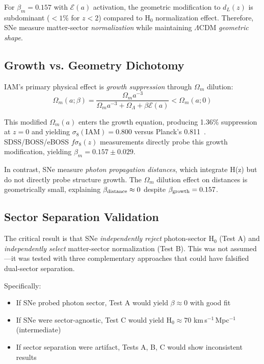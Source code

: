\documentclass[twocolumn,superscriptaddress,prd,amsmath,amssymb]{revtex4-2}
\begin{document}
For $\beta_m = 0.157$ with $\mathcal{E}(a)$ activation, the geometric modification to $d_L(z)$ is subdominant ($<1\%$ for $z < 2$) compared to H$_0$ normalization effect. Therefore, SNe measure matter-sector \textit{normalization} while maintaining $\Lambda$CDM \textit{geometric shape}.

\subsection{Growth vs. Geometry Dichotomy}

IAM's primary physical effect is \textit{growth suppression} through $\Omega_m$ dilution:
\begin{equation}
\Omega_m(a;\beta) = \frac{\Omega_m a^{-3}}{\Omega_m a^{-3} + \Omega_\Lambda + \beta\mathcal{E}(a)} < \Omega_m(a;0)
\end{equation}

This modified $\Omega_m(a)$ enters the growth equation, producing 1.36\% suppression at $z=0$ and yielding $\sigma_8(\text{IAM}) = 0.800$ versus Planck's 0.811~\cite{IAMCompendium2025}. SDSS/BOSS/eBOSS $f\sigma_8(z)$ measurements directly probe this growth modification, yielding $\beta_m = 0.157 \pm 0.029$.

In contrast, SNe measure \textit{photon propagation distances}, which integrate H(z) but do not directly probe structure growth. The $\Omega_m$ dilution effect on distances is geometrically small, explaining $\beta_{\rm distance} \approx 0$ despite $\beta_{\rm growth} = 0.157$.

\subsection{Sector Separation Validation}

The critical result is that SNe \textit{independently reject} photon-sector H$_0$ (Test A) and \textit{independently select} matter-sector normalization (Test B). This was not assumed—it was tested with three complementary approaches that could have falsified dual-sector separation.

Specifically:
\begin{itemize}
\item If SNe probed photon sector, Test A would yield $\beta \approx 0$ with good fit
\item If SNe were sector-agnostic, Test C would yield H$_0 \approx 70$ km\,s$^{-1}$\,Mpc$^{-1}$ (intermediate)
\item If sector separation were artifact, Tests A, B, C would show inconsistent results
\end{itemize}
\end{document}
